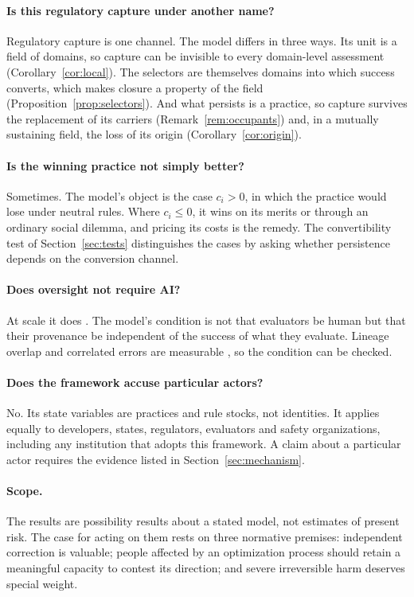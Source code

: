 \documentclass[letterpaper]{article} %
\theoremstyle{definition}
\begin{document}
\paragraph{Is this regulatory capture under another name?} Regulatory capture is one channel. The model differs in three ways. Its unit is a field of domains, so capture can be invisible to every domain-level assessment (Corollary~\ref{cor:local}). The selectors are themselves domains into which success converts, which makes closure a property of the field (Proposition~\ref{prop:selectors}). And what persists is a practice, so capture survives the replacement of its carriers (Remark~\ref{rem:occupants}) and, in a mutually sustaining field, the loss of its origin (Corollary~\ref{cor:origin}).

\paragraph{Is the winning practice not simply better?} Sometimes. The model's object is the case $c_i>0$, in which the practice would lose under neutral rules. Where $c_i\le0$, it wins on its merits or through an ordinary social dilemma, and pricing its costs is the remedy. The convertibility test of Section~\ref{sec:tests} distinguishes the cases by asking whether persistence depends on the conversion channel.

\paragraph{Does oversight not require AI?} At scale it does \citep{perez2022}. The model's condition is not that evaluators be human but that their provenance be independent of the success of what they evaluate. Lineage overlap and correlated errors are measurable \citep{panickssery2024,kim2025}, so the condition can be checked.

\paragraph{Does the framework accuse particular actors?} No. Its state variables are practices and rule stocks, not identities. It applies equally to developers, states, regulators, evaluators and safety organizations, including any institution that adopts this framework. A claim about a particular actor requires the evidence listed in Section~\ref{sec:mechanism}.

\paragraph{Scope.} The results are possibility results about a stated model, not estimates of present risk. The case for acting on them rests on three normative premises: independent correction is valuable; people affected by an optimization process should retain a meaningful capacity to contest its direction; and severe irreversible harm deserves special weight.
\end{document}
